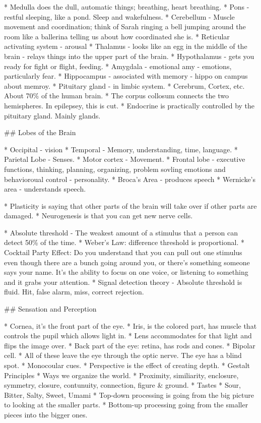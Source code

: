 \documentclass{article}
\begin{document}
\begin{markdown}
* Medulla does the dull, automatic things; breathing, heart breathing.
* Pons - restful sleeping, like a pond. Sleep and wakefulness.
* Cerebellum - Muscle movement and coordination; think of Sarah ringing a bell jumping around the room like a ballerina telling us about how coordinated she is.
* Reticular activating system - arousal
* Thalamus - looks like an egg in the middle of the brain - relays things into the upper part of the brain.
* Hypothalamus - gets you ready for fight or flight, feeding.
* Amygdala - emotional amy - emotions, particularly fear.
* Hippocampus - associated with memory - hippo on campus about memroy.
* Pituitary gland - in limbic system.
* Cerebrum, Cortex, etc. About 70\% of the human brain.
* The corpus collosum connects the two hemispheres. In epilepsey, this is cut.
* Endocrine is practically controlled by the pituitary gland. Mainly glands.

## Lobes of the Brain

* Occipital - vision
* Temporal - Memory, understanding, time, language.
* Parietal Lobe - Senses.
* Motor cortex - Movement.
* Frontal lobe - executive functions, thinking, planning, organizing, problem sovling emotions and behavioroual control - personality.
* Broca's Area - produces speech
* Wernicke's area - understands speech.

* Plasticity is saying that other parts of the brain will take over if other parts are damaged.
* Neurogenesis is that you can get new nerve cells.

* Absolute threshold - The weakest amount of a stimulus that a person can detect 50\% of the time.
* Weber's Law: difference threshold is proportional.
* Cocktail Party Effect: Do you understand that you can pull out one stimulus even though there are a bunch going around you, or there's something someone says your name. It's the ability to focus on one voice, or listening to something and it grabs your attention.
* Signal detection theory - Absolute threshold is fluid. Hit, false alarm, miss, correct rejection.

## Sensation and Perception

* Cornea, it's the front part of the eye.
* Iris, is the colored part, has muscle that controls the pupil which allows light in.
* Lens accommodates for that light and flips the image over.
* Back part of the eye: retina, has rods and cones.
* Bipolar cell.
* All of these leave the eye through the optic nerve. The eye has a blind spot.
* Monocoular cues.
	* Perspective is the effect of creating depth.
* Gestalt Principles
	* Ways we organize the world.
	* Proximity, similiarity, enclosure, symmetry, closure, contunuity, connection, figure & ground.
* Tastes
	* Sour, Bitter, Salty, Sweet, Umami
* Top-down processing is going from the big picture to looking at the smaller parts.
* Bottom-up processing going from the smaller pieces into the bigger ones.


\end{markdown}
\end{document}
